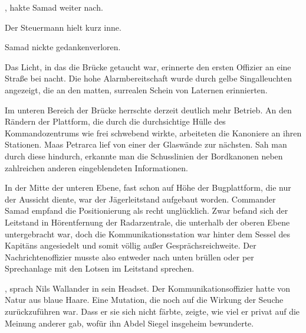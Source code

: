 \par

, hakte Samad weiter nach.

\par

Der Steuermann hielt kurz inne.

\par

Samad nickte gedankenverloren.

\par

Das Licht, in das die Brücke getaucht war, erinnerte den ersten Offizier an eine Straße bei nacht.
Die hohe Alarmbereitschaft wurde durch gelbe Singalleuchten angezeigt, die an den matten, surrealen Schein von Laternen erinnierten.

\par

Im unteren Bereich der Brücke herrschte derzeit deutlich mehr Betrieb.
An den Rändern der Plattform, die durch die durchsichtige Hülle des Kommandozentrums wie frei schwebend wirkte, arbeiteten die Kanoniere an ihren Stationen.
Maas Petrarca lief von einer der Glaswände zur nächsten.
Sah man durch diese hindurch, erkannte man die Schusslinien der Bordkanonen neben zahlreichen anderen eingeblendeten Informationen.

\par

In der Mitte der unteren Ebene, fast schon auf Höhe der Bugplattform, die nur der Aussicht diente, war der Jägerleitstand aufgebaut worden.
Commander Samad empfand die Positionierung als recht unglücklich.
Zwar befand sich der Leitstand in Hörentfernung der Radarzentrale, die unterhalb der oberen Ebene untergebracht war, doch die Kommunikationsstation war hinter dem Sessel des Kapitäns angesiedelt und somit völlig außer Gesprächsreichweite.
Der Nachrichtenoffizier musste also entweder nach unten brüllen oder per Sprechanlage mit den Lotsen im Leitstand sprechen.

\par

, sprach Nils Wallander in sein Headset.
Der Kommunikationsoffizier hatte von Natur aus blaue Haare.
Eine Mutation, die noch auf die Wirkung der Seuche zurückzuführen war.
Dass er sie sich nicht färbte, zeigte, wie viel er privat auf die Meinung anderer gab, wofür ihn Abdel Siegel insgeheim bewunderte. 

